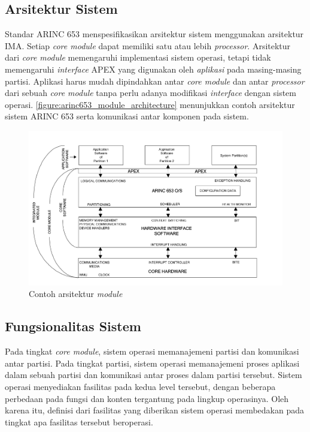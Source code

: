 \subsection{Arsitektur Sistem}

Standar ARINC 653 menspesifikasikan arsitektur sistem menggunakan arsitektur IMA.  Setiap
\textit{core module} dapat memiliki satu atau lebih \textit{processor}. Arsitektur dari
\textit{core module} memengaruhi implementasi sistem operasi, tetapi tidak memengaruhi
\textit{interface} APEX yang digunakan oleh \textit{aplikasi} pada masing-masing partisi.
Aplikasi harus mudah dipindahkan antar \textit{core module} dan antar \textit{processor} dari
sebuah \textit{core module} tanpa perlu adanya modifikasi \textit{interface} dengan sistem
operasi.  \autoref{figure:arinc653_module_architecture} menunjukkan contoh arsitektur sistem
ARINC 653 serta komunikasi antar komponen pada sistem.

\begin{figure}[htbp]
    \centering
    \includegraphics[scale=0.4]{resources/arinc653-architecture.png}
    \caption[Contoh arsitektur \textit{module}]{Contoh arsitektur \textit{module} \citep{AirlinesElectronicEngineeringCommittee2012}}
    \label{figure:arinc653_module_architecture}
\end{figure}

\subsection{Fungsionalitas Sistem}

Pada tingkat \textit{core module}, sistem operasi memanajemeni partisi dan komunikasi antar
partisi.  Pada tingkat partisi, sistem operasi memanajemeni proses aplikasi dalam sebuah partisi
dan komunikasi antar proses dalam partisi tersebut.  Sistem operasi menyediakan fasilitas pada
kedua level tersebut, dengan beberapa perbedaan pada fungsi dan konten tergantung pada lingkup
operasinya.  Oleh karena itu, definisi dari fasilitas yang diberikan sistem operasi membedakan pada tingkat
apa fasilitas tersebut beroperasi.

